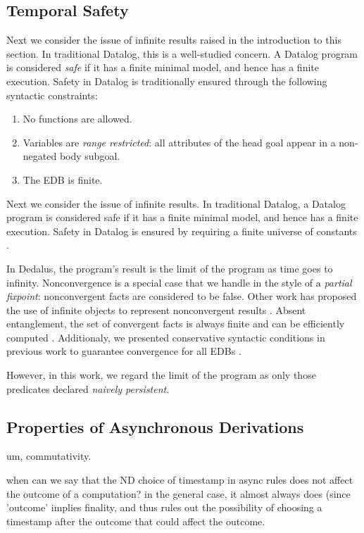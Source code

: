 \subsection{Temporal Safety}
Next we consider the issue of infinite results raised in the introduction to this section.
In traditional Datalog, this is a well-studied concern.
A Datalog program is considered {\em safe} if it has a finite minimal model, and hence has
a finite execution.  Safety in Datalog is traditionally ensured
through the following syntactic constraints:

\begin{enumerate}
%
\item No functions are allowed.
%
\item Variables are \emph{range restricted}: all attributes of the head goal
appear in a non-negated body subgoal.
%
\item The EDB is finite.
%
\end{enumerate}



Next we consider the issue of infinite results.  In traditional Datalog, a Datalog program is considered safe if it has a finite
minimal model, and hence has a finite execution. Safety in Datalog is ensured by requiring a finite universe of constants .

In Dedalus, the program's result is the limit of the program as time goes to infinity.  Nonconvergence is a special case that we handle in the style of a {\em partial fixpoint}: nonconvergent facts are considered to be false.  Other work has proposed the use of infinite objects to represent nonconvergent results .  Absent entanglement, the set of convergent facts is always finite and can be efficiently computed .  Additionaly, we presented conservative syntactic conditions in previous work to guarantee convergence for all EDBs .

However, in this work, we regard the limit of the program as only those predicates declared {\em naively persistent}.  

\subsection{Properties of Asynchronous Derivations}

um, commutativity.

when can we say that the ND choice of timestamp in async rules does not affect the outcome
of a computation?  in the general case, it almost always does (since 'outcome' implies finality,
and thus rules out the possibility of choosing a timestamp after the outcome that could affect the outcome.

